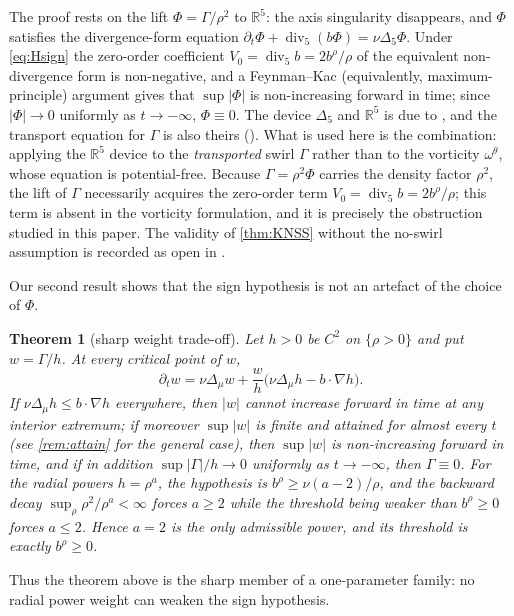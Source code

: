 \documentclass[11pt]{article}
\newtheorem{theorem}{Theorem}[section]
\theoremstyle{definition}
\newcommand{\R}{\mathbb{R}}
\newcommand{\Div}{\operatorname{div}}
\begin{document}
The proof rests on the lift $\Phi=\Gamma/\rho^2$ to $\R^5$: the axis
singularity disappears, and $\Phi$ satisfies the divergence-form equation
$\partial_t\Phi+\Div_5(b\Phi)=\nu\Delta_5\Phi$. Under \eqref{eq:Hsign} the
zero-order coefficient $V_0=\Div_5 b=2b^\rho/\rho$ of the equivalent
non-divergence form is non-negative, and a Feynman--Kac (equivalently,
maximum-principle) argument gives that $\sup|\Phi|$ is non-increasing forward
in time; since $|\Phi|\to0$ uniformly as $t\to-\infty$, $\Phi\equiv0$.
The device $\Delta_5$ and $\R^5$ is due to \cite{KNSS}, and the transport
equation for $\Gamma$ is also theirs (\cite[eq.~(5.12)]{KNSS}). What is used
here is the combination: applying the $\R^5$ device to the \emph{transported}
swirl $\Gamma$ rather than to the vorticity $\omega^\theta$, whose equation
\cite[eq.~(5.16)]{KNSS} is potential-free. Because $\Gamma=\rho^2\Phi$ carries
the density factor $\rho^2$, the lift of $\Gamma$ necessarily acquires the
zero-order term $V_0=\Div_5b=2b^\rho/\rho$; this term is absent in the
vorticity formulation, and it is precisely the obstruction studied in this
paper. The validity of \cref{thm:KNSS} without the no-swirl assumption is
recorded as open in \cite{KNSS}.

Our second result shows that the sign hypothesis is not an artefact of the
choice of $\Phi$.

\begin{theorem}[sharp weight trade-off]\label{thm:weights}
Let $h>0$ be $C^2$ on $\{\rho>0\}$ and put $w=\Gamma/h$. At every critical
point of $w$,
\begin{equation}\label{eq:weight}
\partial_t w=\nu\Delta_\mu w+\frac{w}{h}\bigl(\nu\Delta_\mu h-b\cdot\nabla h\bigr).
\end{equation}
If $\nu\Delta_\mu h\le b\cdot\nabla h$ everywhere, then $|w|$ cannot increase
forward in time at any interior extremum; if moreover $\sup|w|$ is finite and
attained for almost every $t$ (see \cref{rem:attain} for the general case),
then $\sup|w|$ is non-increasing forward in time, and if in addition
$\sup|\Gamma|/h\to0$ uniformly as $t\to-\infty$, then $\Gamma\equiv0$. For the
radial powers $h=\rho^a$,
the hypothesis is $b^\rho\ge\nu(a-2)/\rho$, and the backward decay
$\sup_\rho\rho^2/\rho^a<\infty$ forces $a\ge2$ while the threshold being
weaker than $b^\rho\ge0$ forces $a\le2$. Hence $a=2$ is the only admissible
power, and its threshold is exactly $b^\rho\ge0$.
\end{theorem}

Thus the theorem above is the sharp member of a one-parameter family: no
radial power weight can weaken the sign hypothesis.
\end{document}
